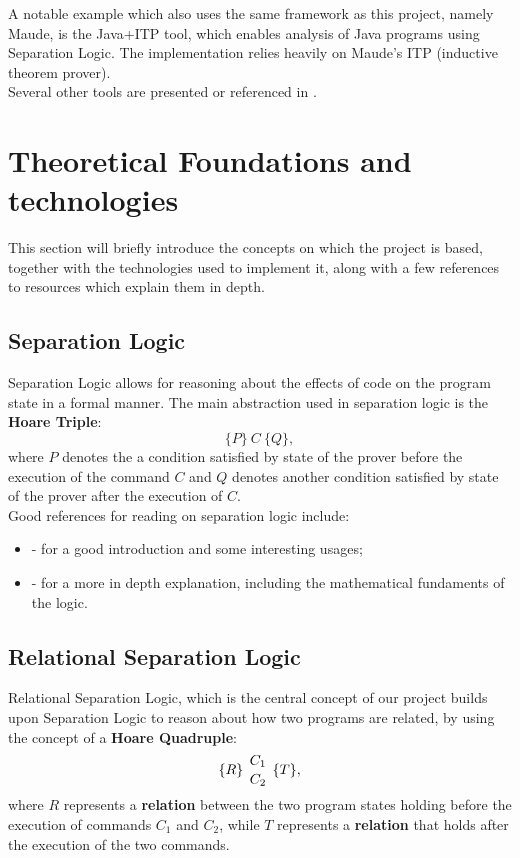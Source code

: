 \documentclass[12pt,a4paper]{article}
\begin{document}
A notable example which also uses the same framework as this project, namely Maude, is the Java+ITP\cite{JAVAITP} tool, which enables analysis of Java programs using Separation Logic. The implementation relies heavily on Maude's ITP (inductive theorem prover).
\\

Several other tools are presented or referenced in \cite{primer}.

\section{Theoretical Foundations and technologies}
This section will briefly introduce the concepts on which the project is based, together with the technologies used to implement it, along with a few references to resources which explain them in depth.
\subsection{Separation Logic}
Separation Logic allows for reasoning about the effects of code on the program state in a formal manner. The main abstraction used in separation logic is the \textbf{Hoare Triple}:
\[ \{P\}\  C\  \{Q\} ,\]
where \(P\) denotes the a condition satisfied by state of the prover before the execution of the command \(C\) and \(Q\) denotes another condition satisfied by state of the prover after the execution of \(C\).
\\

Good references for reading on separation logic include: 
\begin{itemize}
	\item \cite{primer} - for a good introduction and some interesting usages;
	\item \cite{SeparationLogic} - for a more in depth explanation, including the mathematical fundaments of the logic.
\end{itemize} 
\subsection{Relational Separation Logic}
Relational Separation Logic, which is the central concept of our project builds upon Separation Logic to reason about how two programs are related, by using the concept of a \textbf{Hoare Quadruple}:
\[\{R\}\ {C_1 \atop C_2}\   \{T\},\]
where \(R\) represents a \textbf{relation} between the two program states holding before the execution of commands \(C_1\) and \(C_2\), while \(T\) represents a \textbf{relation} that holds after the execution of the two commands. 
\\
\end{document}
